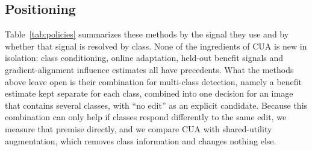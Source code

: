 \subsection{Positioning}

Table~\ref{tab:policies} summarizes these methods by the signal they use and by whether that signal is resolved by class. None of the ingredients of CUA is new in isolation: class conditioning, online adaptation, held-out benefit signals and gradient-alignment influence estimates all have precedents. What the methods above leave open is their combination for multi-class detection, namely a benefit estimate kept separate for each class, combined into one decision for an image that contains several classes, with ``no edit'' as an explicit candidate. Because this combination can only help if classes respond differently to the same edit, we measure that premise directly, and we compare CUA with shared-utility augmentation, which removes class information and changes nothing else.

